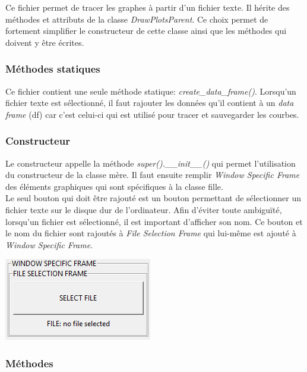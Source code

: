 Ce fichier permet de tracer les graphes à partir d'un fichier texte. Il hérite des méthodes et attributs de la classe \textit{DrawPlotsParent}. Ce choix permet de fortement simplifier le constructeur de cette classe ainsi que les méthodes qui doivent y être écrites.

\subsubsection{Méthodes statiques}

Ce fichier contient une seule méthode statique: \textit{create\_data\_frame()}. Lorsqu'un fichier texte est sélectionné, il faut rajouter les données qu'il contient à un \textit{data frame} (df) car c'est celui-ci qui est utilisé pour tracer et sauvegarder les courbes.

\subsubsection{Constructeur}

Le constructeur appelle la méthode \textit{super().\_\_init\_\_()} qui permet l'utilisation du constructeur de la classe mère. Il faut ensuite remplir \textit{Window Specific Frame} des éléments graphiques qui sont spécifiques à la classe fille.\\

Le seul bouton qui doit être rajouté est un bouton permettant de sélectionner un fichier texte sur le disque dur de l'ordinateur. Afin d'éviter toute ambiguïté, lorsqu'un fichier est sélectionné, il est important d'afficher son nom. Ce bouton et le nom du fichier sont rajoutés à \textit{File Selection Frame} qui lui-même est ajouté à \textit{Window Specific Frame}.

\begin{center}
    \includegraphics[scale=0.7]{images/DrawPlotsFromFile-WindowSpecificFrame.png}
\end{center}

\subsubsection{Méthodes}

